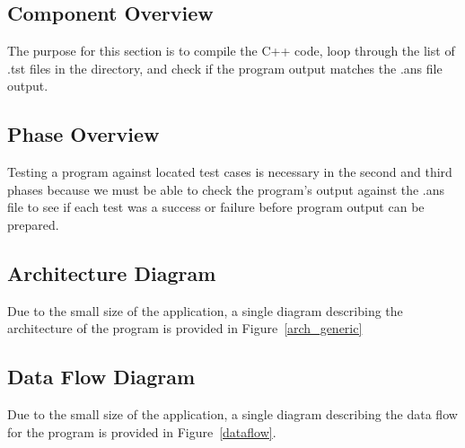 \subsection{Component  Overview}
The purpose for this section is to compile the C++ code, loop through the list of .tst files in the directory, and check if the program output matches the .ans file output.

\subsection{Phase Overview}
Testing a program against located test cases is necessary in the second and third phases because we must be able to check the program's output against the .ans file to see if each test was a success or failure before program output can be prepared.

\subsection{ Architecture  Diagram}
Due to the small size of the application, a single diagram describing the architecture of the program is provided in Figure~\ref{arch_generic}

\subsection{Data Flow Diagram}
Due to the small size of the application, a single diagram describing the data flow for the program is provided in Figure~\ref{dataflow}.


